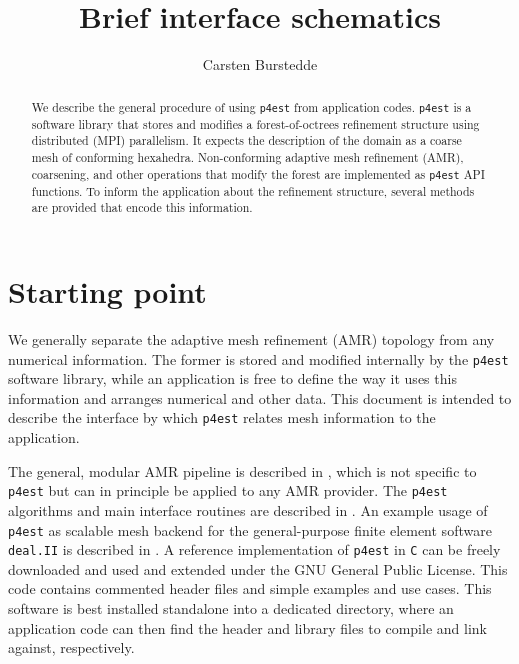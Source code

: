 \documentclass[letterpaper,11pt]{article}
\author{Carsten Burstedde}
\title{Brief \pforest interface schematics}
\newcommand{\dealii}{\texttt{deal.II}\xspace}
\newcommand{\pforest}{\texttt{p4est}\xspace}
\begin{document}
\maketitle

\begin{abstract}
We describe the general procedure of using \pforest from application codes.
\pforest is a software library that stores and modifies a forest-of-octrees
refinement structure using distributed (MPI) parallelism.  It expects the
description of the domain as a coarse mesh of conforming hexahedra.
Non-conforming adaptive mesh refinement (AMR), coarsening, and other operations
that modify the forest are implemented as \pforest API functions.  To inform
the application about the refinement structure, several methods are provided
that encode this information.
\end{abstract}

\section{Starting point}

We generally separate the adaptive mesh refinement (AMR) topology from any
numerical information.  The former is stored and modified internally by the
\pforest software library, while an application is free to define the way it
uses this information and arranges numerical and other data.  This document is
intended to describe the interface by which \pforest relates mesh information
to the application.

The general, modular AMR pipeline is described in
\cite{BursteddeGhattasStadlerEtAl08}, which is not specific to \pforest but can
in principle be applied to any AMR provider.  The \pforest algorithms and main
interface routines are described in \cite{BursteddeWilcoxGhattas11}.
An example usage of \pforest as scalable mesh backend for the general-purpose
finite element software \dealii is described in
\cite{BangerthBursteddeHeisterEtAl11}.  A reference implementation of \pforest
in \texttt{C} can be freely downloaded \cite{Burstedde10} and used and extended
under the GNU General Public License.  This code contains commented header
files and simple examples and use cases.  This software is best installed
standalone into a dedicated directory, where an application code can then find
the header and library files to compile and link against, respectively.
\end{document}
